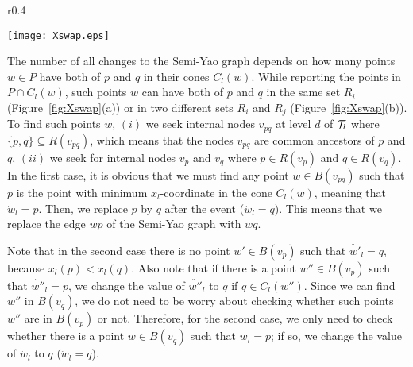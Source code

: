\documentclass[11pt]{llncs}
\begin{document}
\begin{wrapfigure}{r}{0.4\textwidth}
\vspace{-20pt}
  \begin{center}
    \texttt{[image: Xswap.eps]}
  \end{center}
  \vspace{-10pt}
  \caption{\small Two cases when an $x$-swap between $p$ and $q$ occurs.}
  \vspace{-20pt}
  \label{fig:Xswap}
\end{wrapfigure}
The number of all changes to the Semi-Yao graph depends on how many points $w\in P$ have both of $p$ and $q$ in their cones $C_l(w)$. While reporting the points in $P\cap C_l(w)$, such points $w$ can have both of $p$ and $q$ in the same set $R_i$ (Figure~\ref{fig:Xswap}(a)) or in two different sets $R_i$ and $R_j$ (Figure~\ref{fig:Xswap}(b)). To find such points $w$, $(i)$ we seek internal nodes $v_{pq}$ at level $d$ of ${\cal T}_l$ where $\{p,q\}\subseteq R(v_{pq})$, which means that the nodes $v_{pq}$ are common ancestors of $p$ and $q$, $(ii)$ we seek for internal nodes $v_p$ and $v_q$ where $p\in R(v_p)$ and $q\in R(v_q)$. In the first case, it is obvious that we must find any point $w\in B(v_{pq})$ such that $p$ is the point with minimum $x_l$-coordinate in the cone $C_l(w)$, meaning that $\ddot{w}_l=p$. Then, we replace $p$ by $q$ after the event ($\ddot{w}_l=q$). This means that we replace the edge $wp$ of the Semi-Yao graph with $wq$. 

Note that in the second case there is no point $w'\in B(v_p)$ such that $\ddot{w'}_l=q$, because $x_l(p)<x_l(q)$. Also note that if there is a point $w''\in B(v_p)$ such that $\ddot{w''}_l=p$, we change the value of $\ddot{w''}_l$ to $q$ if $q\in C_l(w'')$. Since we can find $w''$ in $B(v_q)$, we do not need to be worry about checking whether such points $w''$ are in $B(v_p)$ or not. Therefore, for the second case, we only need to check whether there is a point $w\in B(v_q)$ such that $\ddot{w}_l=p$; if so, we change the value of $\ddot{w}_l$ to $q$ ($\ddot{w}_l=q$).
\end{document}
